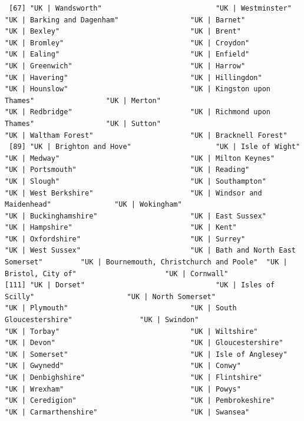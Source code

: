 \documentclass[11pt]{article}
\begin{document}
\begin{verbatim}
 [67] "UK | Wandsworth"                           "UK | Westminster"                          "UK | Barking and Dagenham"                 "UK | Barnet"                               "UK | Bexley"                               "UK | Brent"                                "UK | Bromley"                              "UK | Croydon"                              "UK | Ealing"                               "UK | Enfield"                              "UK | Greenwich"                            "UK | Harrow"                               "UK | Havering"                             "UK | Hillingdon"                           "UK | Hounslow"                             "UK | Kingston upon Thames"                 "UK | Merton"                               "UK | Redbridge"                            "UK | Richmond upon Thames"                 "UK | Sutton"                               "UK | Waltham Forest"                       "UK | Bracknell Forest"                    
 [89] "UK | Brighton and Hove"                    "UK | Isle of Wight"                        "UK | Medway"                               "UK | Milton Keynes"                        "UK | Portsmouth"                           "UK | Reading"                              "UK | Slough"                               "UK | Southampton"                          "UK | West Berkshire"                       "UK | Windsor and Maidenhead"               "UK | Wokingham"                            "UK | Buckinghamshire"                      "UK | East Sussex"                          "UK | Hampshire"                            "UK | Kent"                                 "UK | Oxfordshire"                          "UK | Surrey"                               "UK | West Sussex"                          "UK | Bath and North East Somerset"         "UK | Bournemouth, Christchurch and Poole"  "UK | Bristol, City of"                     "UK | Cornwall"                            
[111] "UK | Dorset"                               "UK | Isles of Scilly"                      "UK | North Somerset"                       "UK | Plymouth"                             "UK | South Gloucestershire"                "UK | Swindon"                              "UK | Torbay"                               "UK | Wiltshire"                            "UK | Devon"                                "UK | Gloucestershire"                      "UK | Somerset"                             "UK | Isle of Anglesey"                     "UK | Gwynedd"                              "UK | Conwy"                                "UK | Denbighshire"                         "UK | Flintshire"                           "UK | Wrexham"                              "UK | Powys"                                "UK | Ceredigion"                           "UK | Pembrokeshire"                        "UK | Carmarthenshire"                      "UK | Swansea"                             

\end{verbatim}
\end{document}
